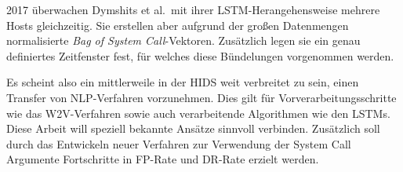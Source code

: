        2017 überwachen Dymshits et al.\ mit ihrer LSTM-Herangehensweise mehrere Hosts gleichzeitig.
        Sie erstellen aber aufgrund der großen Datenmengen normalisierte \textit{Bag of System Call}-Vektoren.
        Zusätzlich legen sie ein genau definiertes Zeitfenster fest, für welches diese Bündelungen vorgenommen werden.~\cite{LSTMDYMSHITS2017}

        Es scheint also ein mittlerweile in der \ac{HIDS} weit verbreitet zu sein, einen Transfer von \ac{NLP}-Verfahren vorzunehmen.
        Dies gilt für Vorverarbeitungsschritte wie das \ac{W2V}-Verfahren sowie auch verarbeitende Algorithmen wie den \acp{LSTM}.
        Diese Arbeit will speziell bekannte Ansätze sinnvoll verbinden.
        Zusätzlich soll durch das Entwickeln neuer Verfahren zur Verwendung der System Call Argumente Fortschritte in \ac{FP}-Rate und \ac{DR}-Rate erzielt werden.





